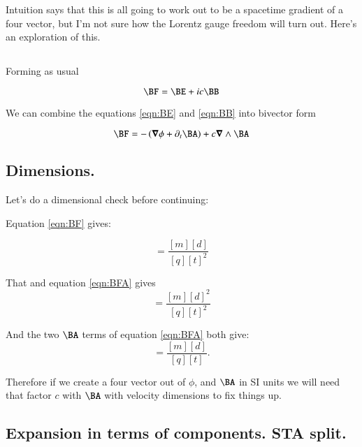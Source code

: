 \documentclass{article}
\newcommand{\spacegrad}[0]{\boldsymbol{\nabla}}
\begin{document}
Intuition says that this is all going to work out to be a spacetime gradient of a four vector, but
I'm not sure how the Lorentz gauge freedom will turn out.  Here's an exploration of this.

\subsection{ }

Forming as usual

\begin{equation}\label{eqn:BF}
\BF = \BE + i c \BB
\end{equation}

We can combine the equations \ref{eqn:BE} and \ref{eqn:BB} into bivector form

\begin{equation}\label{eqn:BFA}
\BF = - \left( \spacegrad \phi + \partial_t \BA \right) + c \spacegrad \wedge \BA
\end{equation}

\subsection{ Dimensions. }

Let's do a dimensional check before continuing:

Equation \ref{eqn:BF} gives:

\begin{equation*}
[\BE] = \frac{[m][d]}{[q][t]^2}
\end{equation*}

That and equation \ref{eqn:BFA} gives
\begin{equation*}
[\phi] = \frac{[m][d]^2}{[q][t]^2}
\end{equation*}

And the two $\BA$ terms of equation \ref{eqn:BFA} both give:
\begin{equation*}
[\BA] = \frac{[m][d]}{[q][t]}.
\end{equation*}

Therefore if we create a four vector out of $\phi$, and $\BA$ in SI units we will need that factor $c$ with $\BA$ with velocity dimensions to fix things up.

\subsection{ Expansion in terms of components.  STA split. }
\end{document}
